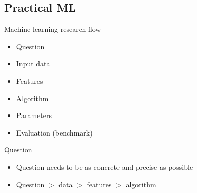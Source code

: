\documentclass[aspectratio=169, xcolor=dvipsnames]{beamer}
\begin{document}
  \subsection{Practical ML}

  \begin{frame}{Machine learning research flow}
    \begin{itemize}
      \item Question
      \item Input data
      \item Features
      \item Algorithm
      \item Parameters
      \item Evaluation (benchmark)
    \end{itemize}
  \end{frame}


  \begin{frame}{Question}
    \begin{itemize}
      \item Question needs to be as concrete and precise as possible

      \item Question $>$ data $>$ features $>$ algorithm
    \end{itemize}
  \end{frame}
\end{document}
